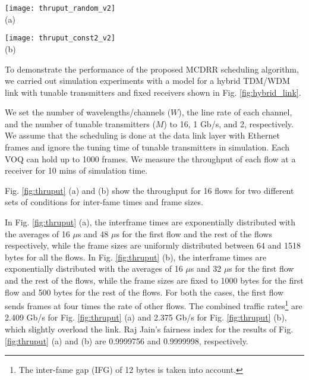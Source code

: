 \documentclass[conference,letterpaper]{IEEEtran}
\begin{document}
\begin{figure*}[hbtp]
  \begin{minipage}{.48\linewidth}
    \begin{center}
     \texttt{[image: thruput\_random\_v2]}\\
      {\scriptsize (a)}
    \end{center}
  \end{minipage}
  \hfill
  \begin{minipage}{.48\linewidth}
    \begin{center}
      \texttt{[image: thruput\_const2\_v2]}\\
      {\scriptsize (b)}
    \end{center}
  \end{minipage}
  \caption{Throughput for 16 flows with (a) exponential interframe times and
    random frame sizes and (b) exponential interframe times and fixed frame
    sizes.}
  \label{fig:thruput}
\end{figure*}
To demonstrate the performance of the proposed MCDRR scheduling algorithm, we
carried out simulation experiments with a model for a hybrid TDM/WDM link with
tunable transmitters and fixed receivers shown in Fig. \ref{fig:hybrid_link}.

We set the number of wavelengths/channels ($W$), the line rate of each channel,
and the number of tunable transmitters ($M$) to 16, 1 Gb/s, and 2,
respectively. We assume that the scheduling is done at the data link layer with
Ethernet frames and ignore the tuning time of tunable transmitters in
simulation. Each VOQ can hold up to 1000 frames. We measure the throughput of
each flow at a receiver for 10 mins of simulation time.

Fig. \ref{fig:thruput} (a) and (b) show the throughput for 16 flows for two
different sets of conditions for inter-fame times and frame sizes.

In Fig. \ref{fig:thruput} (a), the interframe times are exponentially
distributed with the averages of 16 $\mu$s and 48 $\mu$s for the first flow and
the rest of the flows respectively, while the frame sizes are uniformly
distributed between 64 and 1518 bytes for all the flows. In Fig.
\ref{fig:thruput} (b), the interframe times are exponentially distributed with
the averages of 16 $\mu$s and 32 $\mu$s for the first flow and the rest of the
flows, while the frame sizes are fixed to 1000 bytes for the first flow and 500
bytes for the rest of the flows. For both the cases, the first flow sends frames
at four times the rate of other flows. The combined traffic rates\footnote{The
  inter-fame gap (IFG) of 12 bytes is taken into account.} are 2.409 Gb/s for
Fig. \ref{fig:thruput} (a) and 2.375 Gb/s for Fig. \ref{fig:thruput} (b), which
slightly overload the link. Raj Jain's fairness index \cite{Jain:84} for the
results of Fig. \ref{fig:thruput} (a) and (b) are 0.9999756 and 0.9999998,
respectively.
\end{document}
